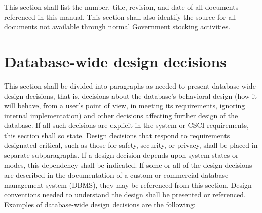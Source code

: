 \documentclass{fidata-report-template}
\begin{document}
This section shall list the number, title, revision, and date of all
documents referenced in this manual. This section shall also identify
the source for all documents not available through normal Government
stocking activities.

\section{Database-wide design decisions}

This section shall be divided into paragraphs as needed to present
database-wide design decisions, that is, decisions about the database's
behavioral design (how it will behave, from a user's point of view, in
meeting its requirements, ignoring internal implementation) and other
decisions affecting further design of the database. If all such
decisions are explicit in the system or CSCI requirements, this section
shall so state. Design decisions that respond to requirements designated
critical, such as those for safety, security, or privacy, shall be
placed in separate subparagraphs. If a design decision depends upon
system states or modes, this dependency shall be indicated. If some or
all of the design decisions are described in the documentation of a
custom or commercial database management system (DBMS), they may be
referenced from this section. Design conventions needed to understand
the design shall be presented or referenced. Examples of database-wide
design decisions are the following:
\end{document}
